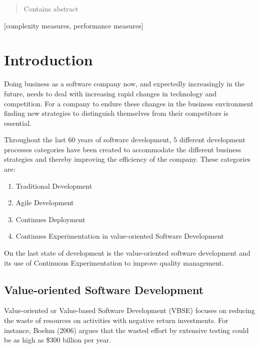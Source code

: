 \documentclass{sig-alternate}
\begin{document}
\maketitle
\begin{abstract}
Contains abstract
\end{abstract}

[complexity measures, performance measures]



\section{Introduction}
Doing business as a software company now, and expectedly increasingly in the future, needs to deal with increasing rapid changes in technology and competition. For a company to endure these changes in the business environment finding new strategies to distinguish themselves from their competitors is essential.\cite{stefan:valuebased}       

Throughout the last 60 years of software development, 5 different development processes categories have been created to accommodate the different business strategies and thereby improving the efficiency of the company. 
These categories are:
\begin{enumerate}
\item Traditional Development
\item Agile Development
\item Continues Deployment 
\item Continues Experimentation in value-oriented Software Development
\end{enumerate}


On the last state of development is the value-oriented software development and its use of Continuous Experimentation to improve quality management.

\subsection{Value-oriented Software Development}
Value-oriented or Value-based Software Development (VBSE) focuses on reducing the waste of resources on activities with negative return investments. For instance, Boehm (2006) argues that the wasted effort by extensive testing could be as high as \$300 billion per year\cite{stefan:valuebased}.
\end{document}
